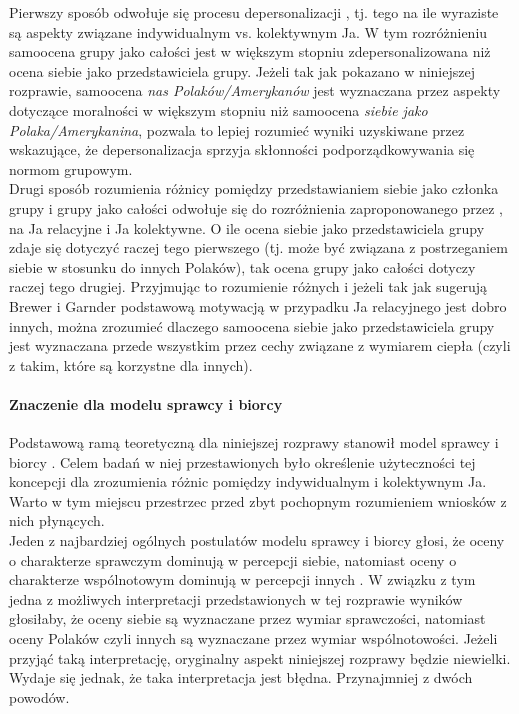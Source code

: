 \documentclass[man]{apa6}
\begin{document}
Pierwszy sposób odwołuje się procesu depersonalizacji \parencite[np.,][]{turner1987rediscovering}, tj. tego na ile wyraziste są aspekty związane indywidualnym vs. kolektywnym Ja. W tym rozróżnieniu samoocena grupy jako całości jest w większym stopniu zdepersonalizowana niż ocena siebie jako przedstawiciela grupy. Jeżeli tak jak pokazano w niniejszej rozprawie, samoocena \emph{nas Polaków/Amerykanów} jest wyznaczana przez aspekty dotyczące moralności w większym stopniu niż samoocena \emph{siebie jako Polaka/Amerykanina}, pozwala to lepiej rozumieć wyniki uzyskiwane przez \textcite{reicher1995social} wskazujące, że depersonalizacja sprzyja skłonności podporządkowywania się normom grupowym.\\

Drugi sposób rozumienia różnicy pomiędzy przedstawianiem siebie jako członka grupy i grupy jako całości odwołuje się do rozróżnienia zaproponowanego przez \textcite{brewer1996we}, na Ja relacyjne i Ja kolektywne. O ile ocena siebie jako przedstawiciela grupy zdaje się dotyczyć raczej tego pierwszego (tj. może być związana z postrzeganiem siebie w stosunku do innych Polaków), tak ocena grupy jako całości dotyczy raczej tego drugiej. Przyjmując to rozumienie różnych i jeżeli tak jak sugerują Brewer i Garnder podstawową motywacją w przypadku Ja relacyjnego jest dobro innych, można zrozumieć dlaczego samoocena siebie jako przedstawiciela grupy jest wyznaczana przede wszystkim przez cechy związane z wymiarem ciepła (czyli z takim, które są korzystne dla innych).\\

\paragraph{Znaczenie dla modelu sprawcy i biorcy} Podstawową ramą teoretyczną dla niniejszej rozprawy stanowił model sprawcy i biorcy \parencite{abele2014communal}. Celem badań w niej przestawionych było określenie użyteczności tej koncepcji dla zrozumienia różnic pomiędzy indywidualnym i kolektywnym Ja. Warto w tym miejscu przestrzec przed zbyt pochopnym rozumieniem wniosków z nich płynących.\\

Jeden z najbardziej ogólnych postulatów modelu sprawcy i biorcy głosi, że oceny o charakterze sprawczym dominują w percepcji siebie, natomiast oceny o charakterze wspólnotowym dominują w percepcji innych \parencite[patrz,][]{wojciszke2005morality}. W związku z tym jedna z możliwych interpretacji przedstawionych w tej rozprawie wyników głosiłaby, że oceny siebie są wyznaczane przez wymiar sprawczości, natomiast oceny Polaków czyli innych są wyznaczane przez wymiar wspólnotowości. Jeżeli przyjąć taką interpretację, oryginalny aspekt niniejszej rozprawy będzie niewielki.  Wydaje się jednak, że taka interpretacja jest błędna. Przynajmniej z dwóch powodów.\\
\end{document}
